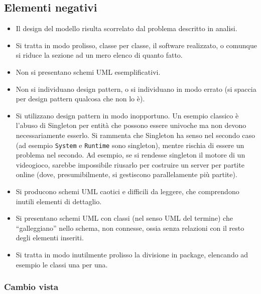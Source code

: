 \documentclass[a4paper,12pt]{report}
\begin{document}
\subsection*{Elementi negativi}
\begin{itemize}
	\item Il design del modello risulta scorrelato dal problema descritto in analisi.
	\item Si tratta in modo prolisso, classe per classe, il software realizzato, o comunque si riduce la sezione ad un mero elenco di quanto fatto.
	\item Non si presentano schemi UML esemplificativi.
	\item Non si individuano design pattern, o si individuano in modo errato (si spaccia per design pattern qualcosa che non lo è).
	\item Si utilizzano design pattern in modo inopportuno. Un esempio classico è l'abuso di
Singleton per entità che possono essere univoche ma non devono necessariamente esserlo. Si rammenta
che Singleton ha senso nel secondo caso (ad esempio \texttt{System} e \texttt{Runtime} sono
singleton), mentre rischia di essere un problema nel secondo. Ad esempio, se si rendesse singleton
il motore di un videogioco, sarebbe impossibile riusarlo per costruire un server per partite online
(dove, presumibilmente, si gestiscono parallelamente più partite).
	\item Si producono schemi UML caotici e difficili da leggere, che comprendono inutili elementi di dettaglio.
	\item Si presentano schemi UML con classi (nel senso UML del termine) che ``galleggiano'' nello schema, non connesse, ossia senza relazioni con il resto degli elementi inseriti.
	\item Si tratta in modo inutilmente prolisso la divisione in package, elencando ad esempio le classi una per una.
\end{itemize}


\subsubsection{Cambio vista}
\end{document}
